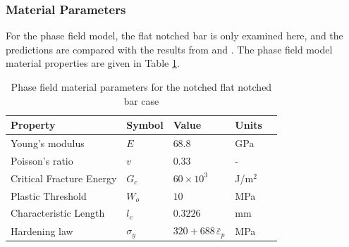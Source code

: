\documentclass[sn-mathphys,Numbered]{sn-jnl}%
\begin{document}
\subsubsection{Material Parameters}
For the phase field model, the flat notched bar is only examined here, and the predictions are compared with the results from \citet{borden_phase-field_2016} and \citet{eldahshan_phase_2021}.
The phase field model material properties are given in Table \ref{table:FNB_material_properties_phaseField}.
\begin{table}[htb]
	\centering
		\begin{tabular}{lllll} \hline
			Property & Symbol & Value & Units  \\ \hline 
			Young's modulus & $E$ & $68.8$ & GPa \\
			Poisson's ratio & $v$ & $0.33$  & - \\
			Critical Fracture Energy & $G_c$ & $60\times10^3$ &  J/m$^2$ \\
			Plastic Threshold & $W_o$ & $10$ &  MPa \\
			Characteristic Length & $l_c$ & $0.3226$ &  mm    \\
			Hardening law & $\sigma_y$ & $320+688\, {\bar{\varepsilon}}_p$ &  MPa  \\
			\hline
		\end{tabular}
	\caption{Phase field material parameters for the notched flat notched bar case}
	\label{table:FNB_material_properties_phaseField}
\end{table}
\end{document}
